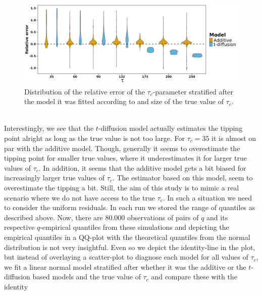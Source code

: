 \begin{figure}[h!]
    \begin{center}
    \includegraphics[scale = .075]{figures/RE_dist_tau.jpeg}
    \caption{Distribution of the relative error of the $\tau_c$-parameter stratified after the model it was fitted according to and size of the true value of $\tau_c$.}
    \label{figure:RE_dist_tau}
    \end{center}
\end{figure}\\
Interestingly, we see that the $t$-diffusion model actually estimates the tipping point alright as long as the true value is not too large. For $\tau_c = 35$ it is almost on par with the additive model. Though, generally it seems to overestimate the tipping point for smaller true values, where it underestimates it for larger true values of $\tau_c$. In addition, it seems that the additive model gets a bit biased for increasingly larger true values of $\tau_c$. The estimator based on this model, seem to overestimate the tipping a bit. Still, the aim of this study is to mimic a real scenario where we do not have access to the true $\tau_c$. In such a situation we need to consider the uniform residuals. In each run we stored the range of quantiles as described above. Now, there are $80.000$ observations of pairs of $q$ and its respective $q$-empirical quantiles from these simulations and depicting the empirical quantiles in a QQ-plot with the theoretical quantiles from the normal distribution is not very insightful. Even so we depict the identity-line in the plot, but instead of overlaying a scatter-plot to diagnose each model for all values of $\tau_c$, we fit a linear normal model stratified after whether it was the additive or the $t$-diffusion based models and the true value of $\tau_c$ and compare these with the identity
